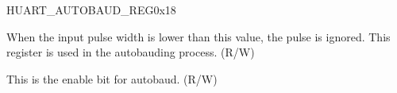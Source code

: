 \begin{register}{H}{UART\_AUTOBAUD\_REG}{0x18}\label{regdesc:UARTAUTOBAUDREG}
%
%
%
%
\regnewline%
\begin{regdesc}\begin{reglist}
\item [UART\_GLITCH\_FILT]When the input pulse width is lower than this value, the pulse is ignored. This register is used in the autobauding process. (R/W)
\item [UART\_AUTOBAUD\_EN]This is the enable bit for autobaud. (R/W)
\end{reglist}\end{regdesc}
\end{register}


